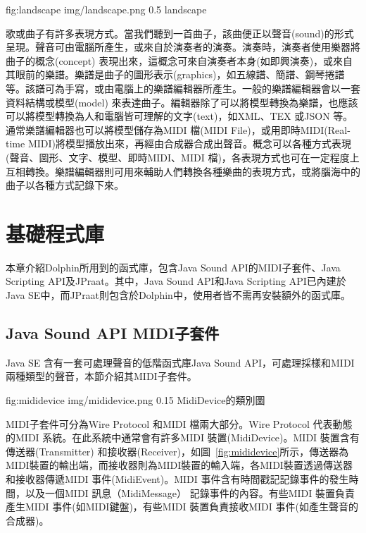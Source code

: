 \documentclass[12pt,a4paper,oneside]{report}
\begin{document}
\figurewithcaption
{fig:landscape}
{img/landscape.png}
{0.5}
{landscape}

歌或曲子有許多表現方式。當我們聽到一首曲子，該曲便正以聲音(sound)的形式呈現。聲音可由電腦所產生，或來自於演奏者的演奏。演奏時，演奏者使用樂器將曲子的概念(concept) 表現出來，這概念可來自演奏者本身(如即興演奏)，或來自其眼前的樂譜。樂譜是曲子的圖形表示(graphics)，如五線譜、簡譜、鋼琴捲譜等。該譜可為手寫，或由電腦上的樂譜編輯器所產生。一般的樂譜編輯器會以一套資料結構或模型(model) 來表達曲子。編輯器除了可以將模型轉換為樂譜，也應該可以將模型轉換為人和電腦皆可理解的文字(text)，如XML、TEX 或JSON 等。通常樂譜編輯器也可以將模型儲存為MIDI 檔(MIDI File)，或用即時MIDI(Real-time MIDI)將模型播放出來，再經由合成器合成出聲音。概念可以各種方式表現(聲音、圖形、文字、模型、即時MIDI、MIDI 檔)，各表現方式也可在一定程度上互相轉換。樂譜編輯器則可用來輔助人們轉換各種樂曲的表現方式，或將腦海中的曲子以各種方式記錄下來。



\section{基礎程式庫} %

本章介紹Dolphin所用到的函式庫，包含Java Sound API\cite{javaSound}的MIDI子套件、Java Scripting API\cite{javaScriptinAPI}及JPraat。其中，Java Sound API和Java Scripting API已內建於Java SE\cite{javaPlatform}中，而JPraat則包含於Dolphin中，使用者皆不需再安裝額外的函式庫。

\subsection{Java Sound API MIDI子套件}

Java SE 含有一套可處理聲音的低階函式庫Java Sound API，可處理採樣和MIDI兩種類型的聲音，本節介紹其MIDI子套件。

\figurewithcaption
{fig:mididevice}
{img/mididevice.png}
{0.15}
{MidiDevice的類別圖}

MIDI子套件可分為Wire Protocol 和MIDI 檔兩大部分。Wire Protocol 代表動態的MIDI 系統。在此系統中通常會有許多MIDI 裝置(MidiDevice)。MIDI 裝置含有傳送器(Transmitter) 和接收器(Receiver)，如圖~\ref{fig:mididevice}所示，傳送器為MIDI裝置的輸出端，而接收器則為MIDI裝置的輸入端，各MIDI裝置透過傳送器和接收器傳遞MIDI 事件(MidiEvent)。MIDI 事件含有時間戳記記錄事件的發生時間，以及一個MIDI 訊息（MidiMessage） 記錄事件的內容。有些MIDI 裝置負責產生MIDI 事件(如MIDI鍵盤)，有些MIDI 裝置負責接收MIDI 事件(如產生聲音的合成器)。
\end{document}
